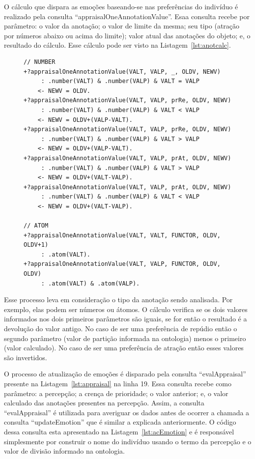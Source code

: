 O cálculo que dispara as emoções baseando-se nas preferências do indivíduo é
realizado pela consulta ``appraisalOneAnnotationValue''. Esaa consulta recebe
por parâmetro: o valor da anotação; o valor de limite da mesma; seu tipo
(atração por números abaixo ou acima do limite); valor atual das anotações do
objeto; e, o resultado do cálculo. Esse cálculo pode ser visto na
Listagem~\ref{lst:anotcalc}.

\begin{figure}
\begin{center}
    \begin{minipage}{130mm}
	\lstset{linewidth=130mm}
	\begin{lstlisting}[frame=trbl,
caption=Amostra de código referente ao cálculo de uma anotação.,
label=lst:anotcalc]
// NUMBER
+?appraisalOneAnnotationValue(VALT, VALP, _, OLDV, NEWV)
     : .number(VALT) & .number(VALP) & VALT = VALP
    <- NEWV = OLDV.
+?appraisalOneAnnotationValue(VALT, VALP, prRe, OLDV, NEWV)
     : .number(VALT) & .number(VALP) & VALT < VALP
    <- NEWV = OLDV+(VALP-VALT).
+?appraisalOneAnnotationValue(VALT, VALP, prRe, OLDV, NEWV)
     : .number(VALT) & .number(VALP) & VALT > VALP
    <- NEWV = OLDV+(VALP-VALT).
+?appraisalOneAnnotationValue(VALT, VALP, prAt, OLDV, NEWV)
     : .number(VALT) & .number(VALP) & VALT > VALP
    <- NEWV = OLDV+(VALT-VALP).
+?appraisalOneAnnotationValue(VALT, VALP, prAt, OLDV, NEWV)
     : .number(VALT) & .number(VALP) & VALT < VALP
    <- NEWV = OLDV+(VALT-VALP).

// ATOM
+?appraisalOneAnnotationValue(VALT, VALT, FUNCTOR, OLDV, OLDV+1)
     : .atom(VALT).
+?appraisalOneAnnotationValue(VALT, VALP, FUNCTOR, OLDV, OLDV)
     : .atom(VALT) & .atom(VALP).
	\end{lstlisting}
    \end{minipage}
\end{center}
\end{figure}

Esse processo leva em consideração o tipo da anotação sendo analisada. Por
exemplo, elas podem ser números ou átomos. O cálculo verifica se os dois
valores informados nos dois primeiros parâmetros são iguais, se for então o
resultado é a devolução do valor antigo. No caso de ser uma preferência de
repúdio então o segundo parâmetro (valor de partição informada na ontologia)
menos o primeiro (valor calculado). No caso de ser uma preferência de atração
então esses valores são invertidos.

O processo de atualização de emoções é disparado pela consulta
``evalAppraisal'' presente na Listagem~\ref{lst:appraisal} na linha 19.
Essa consulta recebe como parâmetro: a percepção; a crença de prioridade;
o valor anterior; e, o valor calculado das anotações presentes na percepção.
Assim, a consulta ``evalAppraisal'' é utilizada para averiguar os dados antes
de ocorrer a chamada a consulta ``updateEmotion'' que é similar a explicada
anteriormente. O código dessa consulta esta apresentado na
Listagem~\ref{lst:acEmotion} e é responsável simplesmente por construir o
nome do indivíduo usando o termo da percepção e o valor de divisão informado
na ontologia.

